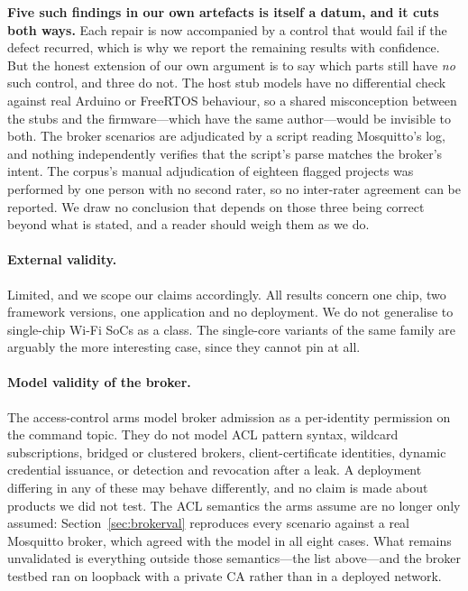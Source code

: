 \textbf{Five such findings in our own artefacts is itself a datum, and it cuts both ways.} Each
repair is now accompanied by a control that would fail if the defect recurred, which is why we
report the remaining results with confidence. But the honest extension of our own argument is to
say which parts still have \emph{no} such control, and three do not. The host stub models have no
differential check against real Arduino or FreeRTOS behaviour, so a shared misconception between
the stubs and the firmware---which have the same author---would be invisible to both. The broker
scenarios are adjudicated by a script reading Mosquitto's log, and nothing independently verifies
that the script's parse matches the broker's intent. The corpus's manual adjudication of eighteen
flagged projects was performed by one person with no second rater, so no inter-rater agreement can
be reported. We draw no conclusion that depends on those three being correct beyond what is
stated, and a reader should weigh them as we do.

\paragraph{External validity.} Limited, and we scope our claims accordingly. All results concern
one chip, two framework versions, one application and no deployment. We do not generalise to
single-chip Wi-Fi SoCs as a class. The single-core variants of the same family are arguably the
more interesting case, since they cannot pin at all.

\paragraph{Model validity of the broker.} The access-control arms model broker admission as a
per-identity permission on the command topic. They do not model ACL pattern syntax, wildcard
subscriptions, bridged or clustered brokers, client-certificate identities, dynamic credential
issuance, or detection and revocation after a leak. A deployment differing in any of these may
behave differently, and no claim is made about products we did not test. The ACL semantics the arms assume are
no longer only assumed: Section~\ref{sec:brokerval} reproduces every scenario against a real
Mosquitto broker, which agreed with the model in all eight cases. What remains unvalidated is
everything outside those semantics---the list above---and the broker testbed ran on loopback
with a private CA rather than in a deployed network.


